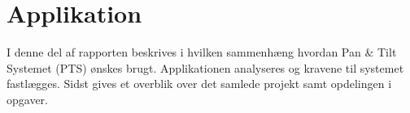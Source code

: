 \cleardoublepage
{}
\setcounter{page}{1}
\part{Applikation}
I denne del af rapporten beskrives i hvilken sammenhæng hvordan Pan \& Tilt Systemet (PTS) 
ønskes brugt. Applikationen analyseres og kravene til systemet fastlægges. Sidst 
gives et overblik over det samlede projekt samt opdelingen i opgaver.



